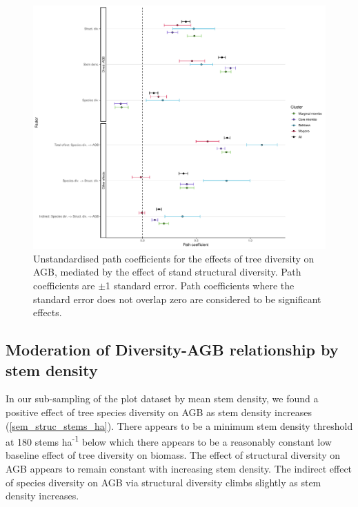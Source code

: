 \documentclass[11pt,a4paper]{article}
\newcommand{\textapprox}{\raisebox{0.5ex}{\texttildelow}}  %
\begin{document}
\begin{figure}[H]
\centering
	\includegraphics[width=\textwidth]{struc_model_slopes_all}
	\caption{Unstandardised path coefficients for the effects of tree diversity on AGB, mediated by the effect of stand structural diversity. Path coefficients are $\pm$1 standard error. Path coefficients where the standard error does not overlap zero are considered to be significant effects.}
	\label{struc_model_slopes_all}
\end{figure}



\subsection{Moderation of Diversity-AGB relationship by stem density}

In our sub-sampling of the plot dataset by mean stem density, we found a positive effect of tree species diversity on AGB as stem density increases (\autoref{sem_struc_stems_ha}). There appears to be a minimum stem density threshold at \textapprox{}180 stems ha\textsuperscript{-1} below which there appears to be a reasonably constant low baseline effect of tree diversity on biomass. The effect of structural diversity on AGB appears to remain constant with increasing stem density. The indirect effect of species diversity on AGB via structural diversity climbs slightly as stem density increases.
\end{document}
